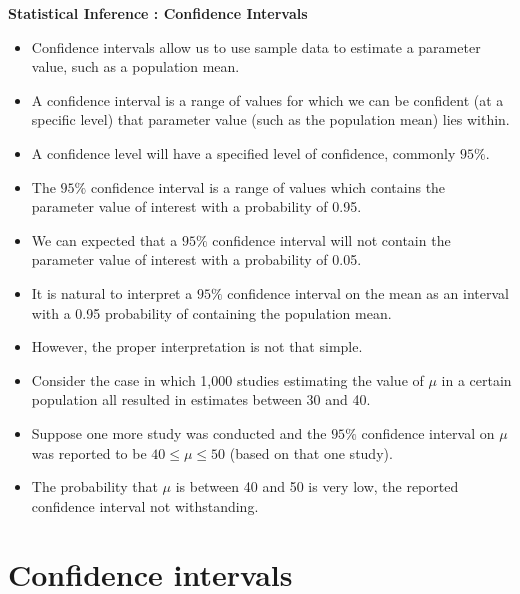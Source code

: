 \textbf{Statistical Inference : Confidence Intervals}
\begin{itemize}
	\item Confidence intervals allow us to use sample data to estimate a parameter value, such as a population mean.
	\item A confidence interval is a range of values for which we can be confident (at a specific level) that parameter value (such as the population mean)  lies within.
	\item A confidence level will have a specified level of confidence, commonly $95\%$.
	\item The $95\%$ confidence interval is a range of values which contains the parameter value of interest with a probability of 0.95.
	\item We can expected that a $95\%$ confidence interval will not contain the parameter value of interest with a probability of 0.05.

	\item It is natural to interpret a $95\%$ confidence interval on the mean as an interval with a 0.95 probability of containing the population mean.
	\item However, the proper interpretation is not that simple.
	\item Consider the case in which 1,000 studies estimating the value of $\mu$  in a certain population all resulted
	in estimates between 30 and 40. \smallskip 
	\item Suppose one more study was conducted and the $95\%$ confidence interval on $\mu$ was reported 
	to be $40 \leq \mu \leq 50$ (based on that one study).
	
	\item The probability that $\mu$ is between 40 and 50 is very low, the reported confidence interval not withstanding.
	
\end{itemize}

\section{Confidence intervals}


